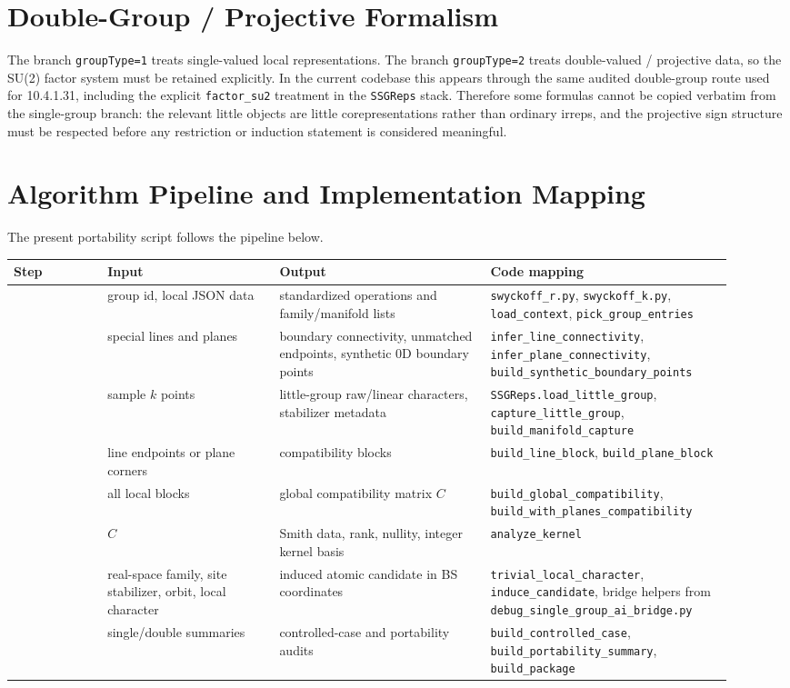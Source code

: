 \documentclass[11pt]{article}
\begin{document}
\section{Double-Group / Projective Formalism}
The branch \texttt{groupType=1} treats single-valued local representations. The branch \texttt{groupType=2} treats double-valued / projective data, so the SU(2) factor system must be retained explicitly. In the current codebase this appears through the same audited double-group route used for 10.4.1.31, including the explicit \texttt{factor\_su2} treatment in the \texttt{SSGReps} stack. Therefore some formulas cannot be copied verbatim from the single-group branch: the relevant little objects are little corepresentations rather than ordinary irreps, and the projective sign structure must be respected before any restriction or induction statement is considered meaningful.

\section{Algorithm Pipeline and Implementation Mapping}
The present portability script follows the pipeline below.

\begin{longtable}{>{\raggedright\arraybackslash}p{0.12\linewidth}>{\raggedright\arraybackslash}p{0.22\linewidth}>{\raggedright\arraybackslash}p{0.27\linewidth}>{\raggedright\arraybackslash}p{0.31\linewidth}}
\toprule
Step & Input & Output & Code mapping \\
\midrule
1 & group id, local JSON data & standardized operations and family/manifold lists & \texttt{swyckoff\_r.py}, \texttt{swyckoff\_k.py}, \texttt{load\_context}, \texttt{pick\_group\_entries} \\
2 & special lines and planes & boundary connectivity, unmatched endpoints, synthetic 0D boundary points & \texttt{infer\_line\_connectivity}, \texttt{infer\_plane\_connectivity}, \texttt{build\_synthetic\_boundary\_points} \\
3 & sample $k$ points & little-group raw/linear characters, stabilizer metadata & \texttt{SSGReps.load\_little\_group}, \texttt{capture\_little\_group}, \texttt{build\_manifold\_capture} \\
4 & line endpoints or plane corners & compatibility blocks & \texttt{build\_line\_block}, \texttt{build\_plane\_block} \\
5 & all local blocks & global compatibility matrix $C$ & \texttt{build\_global\_compatibility}, \texttt{build\_with\_planes\_compatibility} \\
6 & $C$ & Smith data, rank, nullity, integer kernel basis & \texttt{analyze\_kernel} \\
7 & real-space family, site stabilizer, orbit, local character & induced atomic candidate in BS coordinates & \texttt{trivial\_local\_character}, \texttt{induce\_candidate}, bridge helpers from \texttt{debug\_single\_group\_ai\_bridge.py} \\
8 & single/double summaries & controlled-case and portability audits & \texttt{build\_controlled\_case}, \texttt{build\_portability\_summary}, \texttt{build\_package} \\
\bottomrule
\end{longtable}
\end{document}
